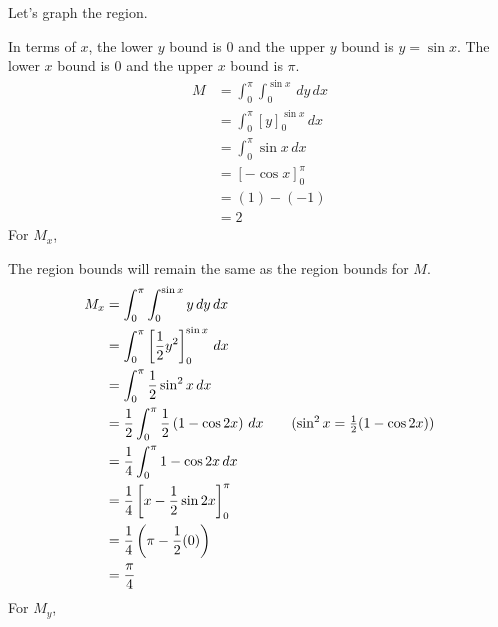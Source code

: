 \documentclass{article}
\newcommand{\lrp}[1]{\left( #1 \right)}
\newcommand{\lrb}[1]{\left[ #1 \right]}
\begin{document}
Let's graph the region. 
\begin{center}
\end{center}
In terms of $x$, the lower $y$ bound is $0$ and the upper $y$ bound is $y=\sin x$. The lower $x$ bound is $0$ and the upper $x$ bound is $\pi$.
\begin{align*}
    M&=\int_0^\pi\int_0^{\sin x}\,dy\,dx\\
    &=\int_0^\pi \lrb{y}_0^{\sin x}\,dx\\
    &=\int_0^\pi \sin x\,dx\\
    &=\lrb{-\cos x}_0^\pi\\
    &=(1)-(-1)\\
    &=2
\end{align*}
For $M_x$,

The region bounds will remain the same as the region bounds for $M$.
\begin{align*}
    M_x&=\int_0^\pi\int_0^{\sin x}y\,dy\,dx\\
    &=\int_0^\pi \lrb{\frac{1}{2}y^2}_0^{\sin x}\,dx\\
    &=\int_0^\pi \frac{1}{2}\sin^2 x\,dx\\
    &=\frac{1}{2}\int_0^\pi\frac{1}{2} \lrp{1-\cos 2x}\,dx\tag{$\sin^2 x=\frac{1}{2}(1-\cos 2x)$}\\
    &=\frac{1}{4}\int_0^\pi 1-\cos 2x\,dx\\
    &=\frac{1}{4}\lrb{x-\frac{1}{2}\sin 2x}_0^{\pi}\\
    &=\frac{1}{4}\lrp{\pi-\frac{1}{2}(0)}\\
    &=\frac{\pi}{4}
\end{align*}
For $M_y$,
\end{document}
